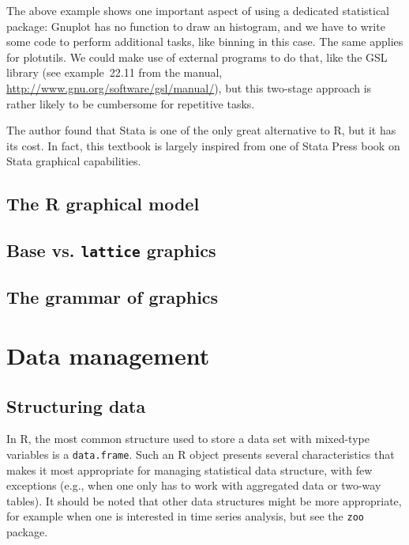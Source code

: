 \documentclass[a4paper,twoside]{book}
\renewcommand{\texttt}[1]{\lstinline{#1}}
\newcommand{\R}{\textsf{R}\xspace}
\begin{document}
The above example shows one important aspect of using a dedicated
statistical package: \textsf{Gnuplot} has no function to draw an
histogram, and we have to write some code to perform additional tasks,
like binning in this case. The same applies for
\textsf{plotutils}. We could make use of external programs to do that,
like the \textsf{GSL} library (see example~22.11 from the manual,
\url{http://www.gnu.org/software/gsl/manual/}), but this two-stage
approach is rather likely to be cumbersome for repetitive tasks.

The author found that \textsf{Stata} is one of the only great
alternative to \R, but it has its cost. In fact, this textbook is
largely inspired from one of Stata Press book on \textsf{Stata}
graphical capabilities\autocite{mitchell08}.

\section{The \R graphical model}

\section{Base vs. {\tt lattice} graphics}

\section{The grammar of graphics}

\chapter{Data management}

\section{Structuring data}
In R, the most common structure used to store a data set with
mixed-type variables is a \texttt{data.frame}. Such an \R object
presents several characteristics that makes it most appropriate for
managing statistical data structure, with few exceptions (e.g., when
one only has to work with aggregated data or two-way tables). It
should be noted that other data structures might be more appropriate,
for example when one is interested in time series analysis, but see
the \texttt{zoo} package\autocite{zeilis05}.
\end{document}
